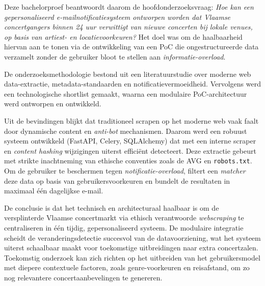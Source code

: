 Deze bachelorproef beantwoordt daarom de hoofdonderzoeksvraag: 
\textit{Hoe kan een gepersonaliseerd e-mailnotificatiesysteem ontworpen worden dat Vlaamse concertgangers binnen 24 uur verwittigt van nieuwe concerten bij lokale venues, op basis van artiest- en locatievoorkeuren?} 
Het doel was om de haalbaarheid hiervan aan te tonen via de ontwikkeling van een \gls{PoC} die ongestructureerde data verzamelt zonder de gebruiker bloot te stellen aan \textit{informatie-overload}.

De onderzoeksmethodologie bestond uit een literatuurstudie over moderne web data-extractie, metadata-standaarden en notificatievermoeidheid. 
Vervolgens werd een technologische shortlist gemaakt, waarna een modulaire PoC-architectuur werd ontworpen en ontwikkeld. 

Uit de bevindingen blijkt dat traditioneel scrapen op het moderne web vaak faalt door dynamische content en \textit{anti-bot} mechanismen. 
Daarom werd een robuust systeem ontwikkeld (FastAPI, Celery, SQLAlchemy) dat met een interne scraper en \textit{content hashing} wijzigingen uiterst efficiënt detecteert. 
Deze extractie gebeurt met strikte inachtneming van ethische conventies zoals de \gls{AVG} en \texttt{robots.txt}. Om de gebruiker te beschermen tegen \textit{notificatie-overload}, filtert een \textit{matcher} 
deze data op basis van gebruikersvoorkeuren en bundelt de resultaten in maximaal één dagelijkse e-mail.

De conclusie is dat het technisch en architecturaal haalbaar is om de versplinterde Vlaamse concertmarkt via ethisch verantwoorde \textit{webscraping} te centraliseren in één tijdig, gepersonaliseerd systeem. 
De modulaire integratie scheidt de veranderingsdetectie succesvol van de datavoorziening, wat het systeem uiterst schaalbaar maakt voor toekomstige uitbreidingen naar extra concertzalen. 
Toekomstig onderzoek kan zich richten op het uitbreiden van het gebruikersmodel met diepere contextuele factoren, zoals genre-voorkeuren en reisafstand, om zo nog relevantere concertaanbevelingen te genereren.